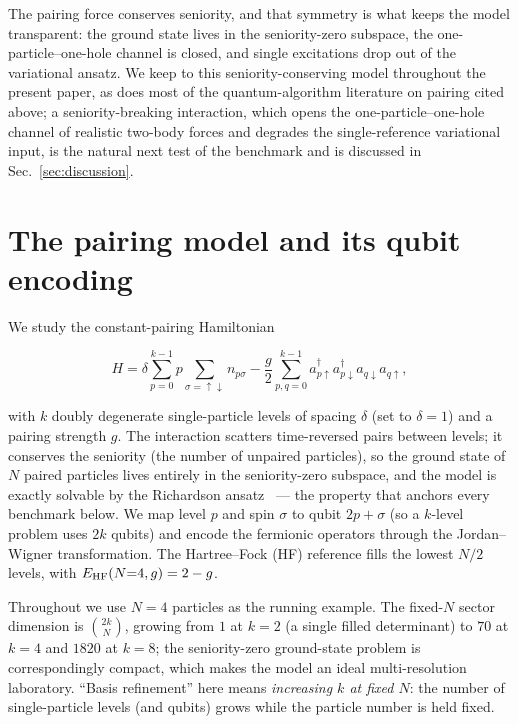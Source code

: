 \documentclass[
  aps,            %
  prc,            %
  reprint,        %
  superscriptaddress,
  floatfix,
  nofootinbib
]{revtex4-2}
\begin{document}
The pairing force conserves seniority, and that symmetry is what keeps the
model transparent: the ground state lives in the seniority-zero subspace, the
one-particle--one-hole channel is closed, and single excitations drop out of
the variational ansatz.  We keep to this seniority-conserving model
throughout the present paper, as does most of the quantum-algorithm
literature on pairing cited above; a seniority-breaking interaction, which
opens the one-particle--one-hole channel of realistic two-body forces and
degrades the single-reference variational input, is the natural next test
of the benchmark and is discussed in Sec.~\ref{sec:discussion}.

\section{The pairing model and its qubit encoding}
We study the constant-pairing Hamiltonian
\begin{widetext}
\begin{equation}
  H=\delta\sum_{p=0}^{k-1} p\sum_{\sigma=\uparrow\downarrow} n_{p\sigma}
   -\frac{g}{2}\sum_{p,q=0}^{k-1} a^\dagger_{p\uparrow}a^\dagger_{p\downarrow}
     a_{q\downarrow}a_{q\uparrow},
  \label{eq:H}
\end{equation}
\end{widetext}
with $k$ doubly degenerate single-particle levels of spacing $\delta$ (set to
$\delta=1$) and a pairing strength $g$.  The interaction scatters time-reversed
pairs between levels; it conserves the seniority (the number of unpaired particles),
so the ground state of $N$ paired particles lives entirely in the seniority-zero
subspace, and the model is exactly solvable by the Richardson
ansatz~\cite{Richardson1963,RichardsonSherman1964,Dukelsky2004} --- the property
that anchors every benchmark below.  We map level $p$ and spin $\sigma$ to qubit $2p+\sigma$ (so a $k$-level
problem uses $2k$ qubits) and encode the fermionic operators through the
Jordan--Wigner transformation.  The Hartree--Fock (HF) reference fills the lowest
$N/2$ levels, with $E_{\rm HF}(N{=}4,g)=2-g$.

Throughout we use $N=4$ particles as the running example.  The fixed-$N$ sector
dimension is $\binom{2k}{N}$, growing from $1$ at $k=2$ (a single filled
determinant) to $70$ at $k=4$ and $1820$ at $k=8$; the seniority-zero ground-state
problem is correspondingly compact, which makes the model an ideal multi-resolution
laboratory.  ``Basis refinement'' here means \emph{increasing $k$ at fixed $N$}: the
number of single-particle levels (and qubits) grows while the particle number is
held fixed.
\end{document}
